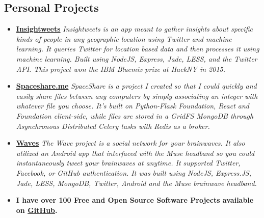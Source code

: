\documentclass[12pt,a4paper,sans]{moderncv} %
\begin{document}
\vspace{10pt}


\subsection{Personal Projects}

\vspace{5pt}

\begin{itemize}

\item{\textbf{\href{http://insightweets.mybluemix.net/landing}{Insightweets}}\textit{ Insightweets is an app meant to gather insights about specific kinds of people in any geographic location using Twitter and machine learning. It queries Twitter for location based data and then processes it using machine learning. Built using NodeJS, Express, Jade, LESS, and the Twitter API. This project won the IBM Bluemix prize at HackNY in 2015.}}

\vspace{5pt}


\item{\textbf{\href{http://spaceshare.me}{Spaceshare.me}} \textit{ SpaceShare is a project I created so that I could quickly and easily share files between any computers by simply associating an integer with whatever file you choose. It's built on Python-Flask Foundation, React and Foundation client-side, while files are stored in a GridFS MongoDB through Asynchronous Distributed Celery tasks with Redis as a broker.}}

\vspace{5pt}

\item{\textbf{\href{https://github.com/davidawad/waves}{Waves}}\textit{ The Wave project is a social network for your brainwaves. It also utilized an Android app that interfaced with the Muse headband so you could instantaneously tweet your brainwaves at anytime. It supported Twitter, Facebook, or GitHub authentication. It was built using NodeJS, Express.JS, Jade, LESS, MongoDB, Twitter, Android and the Muse brainwave headband.}}

\vspace{5pt}

\item{\textbf{I have over 100 Free and Open Source Software Projects available on \href{https://github.com/davidawad}{GitHub}.}}

\vspace{5pt}

\end{itemize}
\end{document}
